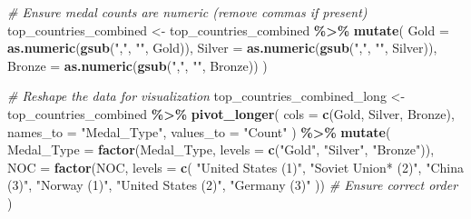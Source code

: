 \documentclass[
]{article}
\newenvironment{Shaded}{\begin{snugshade}}{\end{snugshade}}
\newcommand{\AttributeTok}[1]{\textcolor[rgb]{0.13,0.29,0.53}{#1}}
\newcommand{\CommentTok}[1]{\textcolor[rgb]{0.56,0.35,0.01}{\textit{#1}}}
\newcommand{\FunctionTok}[1]{\textcolor[rgb]{0.13,0.29,0.53}{\textbf{#1}}}
\newcommand{\NormalTok}[1]{#1}
\newcommand{\OtherTok}[1]{\textcolor[rgb]{0.56,0.35,0.01}{#1}}
\newcommand{\SpecialCharTok}[1]{\textcolor[rgb]{0.81,0.36,0.00}{\textbf{#1}}}
\newcommand{\StringTok}[1]{\textcolor[rgb]{0.31,0.60,0.02}{#1}}
\begin{document}
\begin{Shaded}
\begin{Highlighting}[]
\CommentTok{\# Ensure medal counts are numeric (remove commas if present)}
\NormalTok{top\_countries\_combined }\OtherTok{\textless{}{-}}\NormalTok{ top\_countries\_combined }\SpecialCharTok{\%\textgreater{}\%}
  \FunctionTok{mutate}\NormalTok{(}
    \AttributeTok{Gold =} \FunctionTok{as.numeric}\NormalTok{(}\FunctionTok{gsub}\NormalTok{(}\StringTok{","}\NormalTok{, }\StringTok{""}\NormalTok{, Gold)),}
    \AttributeTok{Silver =} \FunctionTok{as.numeric}\NormalTok{(}\FunctionTok{gsub}\NormalTok{(}\StringTok{","}\NormalTok{, }\StringTok{""}\NormalTok{, Silver)),}
    \AttributeTok{Bronze =} \FunctionTok{as.numeric}\NormalTok{(}\FunctionTok{gsub}\NormalTok{(}\StringTok{","}\NormalTok{, }\StringTok{""}\NormalTok{, Bronze))}
\NormalTok{  )}

\CommentTok{\# Reshape the data for visualization}
\NormalTok{top\_countries\_combined\_long }\OtherTok{\textless{}{-}}\NormalTok{ top\_countries\_combined }\SpecialCharTok{\%\textgreater{}\%}
  \FunctionTok{pivot\_longer}\NormalTok{(}
    \AttributeTok{cols =} \FunctionTok{c}\NormalTok{(Gold, Silver, Bronze),}
    \AttributeTok{names\_to =} \StringTok{"Medal\_Type"}\NormalTok{,}
    \AttributeTok{values\_to =} \StringTok{"Count"}
\NormalTok{  ) }\SpecialCharTok{\%\textgreater{}\%}
  \FunctionTok{mutate}\NormalTok{(}
    \AttributeTok{Medal\_Type =} \FunctionTok{factor}\NormalTok{(Medal\_Type, }\AttributeTok{levels =} \FunctionTok{c}\NormalTok{(}\StringTok{"Gold"}\NormalTok{, }\StringTok{"Silver"}\NormalTok{, }\StringTok{"Bronze"}\NormalTok{)),}
    \AttributeTok{NOC =} \FunctionTok{factor}\NormalTok{(NOC, }\AttributeTok{levels =} \FunctionTok{c}\NormalTok{(}
      \StringTok{"United States (1)"}\NormalTok{, }\StringTok{"Soviet Union* (2)"}\NormalTok{, }\StringTok{"China (3)"}\NormalTok{,}
      \StringTok{"Norway (1)"}\NormalTok{, }\StringTok{"United States (2)"}\NormalTok{, }\StringTok{"Germany (3)"}
\NormalTok{    )) }\CommentTok{\# Ensure correct order}
\NormalTok{  )}


\end{Highlighting}
\end{Shaded}
\end{document}
